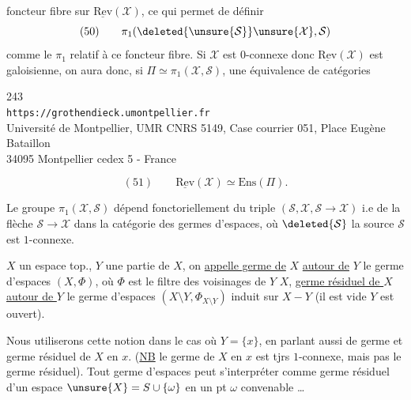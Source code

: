 foncteur fibre sur $\underline{\mathrm{Rev}}(\mathcal X)$, ce qui permet de définir
\[
(50)\qquad \pi_1(\deleted{\unsure{\mathcal S}}\unsure{\mathcal X},\mathcal S)
\]
comme le $\pi_1$ relatif à ce foncteur fibre. Si $\mathcal X$ est $0$-connexe donc $\underline{\mathrm{Rev}}(\mathcal X)$ est galoisienne, on aura donc, si $\Pi\simeq\pi_1(\mathcal X,\mathcal S)$, une équivalence de catégories


\begin{center}
243\\
\texttt{https://grothendieck.umontpellier.fr}\\
Université de Montpellier, UMR CNRS 5149, Case courrier 051, Place Eugène Bataillon\\
34095 Montpellier cedex 5 - France
\end{center}

\[
(51)\qquad \underline{\mathrm{Rev}}(\mathcal X)\simeq\mathrm{Ens}(\Pi).
\]

Le groupe $\pi_1(\mathcal X,\mathcal S)$ dépend fonctoriellement du triple $(\mathcal S,\mathcal X,\mathcal S\longrightarrow\mathcal X)$ i.e de la flèche $\mathcal S\longrightarrow\mathcal X$ dans la catégorie des germes d'espaces, où $\deleted{\mathcal S}$ la source $\mathcal S$ est $1$-connexe.

 $X$ un espace top., $Y$ une partie de $X$, on \uline{appelle germe de} $X$ \uline{autour de} $Y$ le germe d'espaces $(X,\Phi)$, où $\Phi$ est le filtre des voisinages de $Y$  $X$, \uline{germe résiduel de $X$ autour de $Y$} le germe d'espaces $(X\setminus Y,\Phi_{X\setminus Y})$ induit sur $X-Y$ (il est vide  $Y$ est ouvert).


Nous utiliserons cette notion  dans le cas où $Y=\{x\}$, en parlant aussi de germe et germe résiduel de $X$ en $x$. (\uline{NB} le germe de $X$ en $x$ est tjrs  $1$-connexe, mais pas le germe résiduel). Tout germe d'espaces  peut s'interpréter comme germe résiduel d'un espace  $\unsure{X}=S\cup\{\omega\}$ en un pt $\omega$ convenable \ldots

